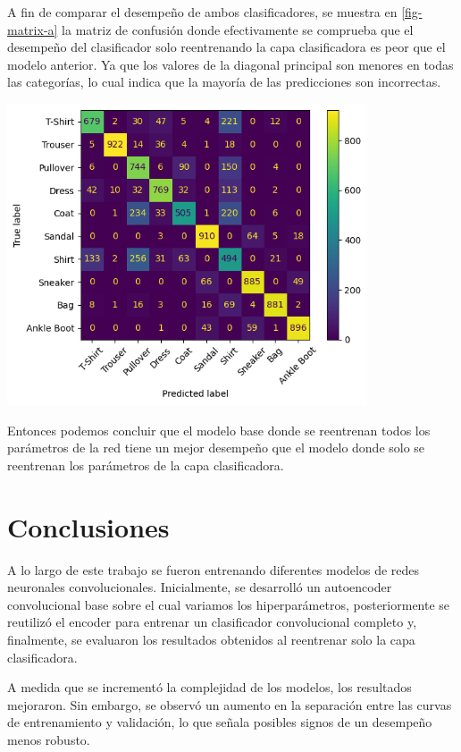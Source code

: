 \documentclass[aps,prl,reprint,groupedaddress]{revtex4-2}
\newenvironment{Figura}
  {\par\medskip\noindent\minipage{\linewidth}}
  {\endminipage\par\medskip}
\begin{document}
A fin de comparar el desempeño de ambos clasificadores, se muestra en 
\ref{fig-matrix-a} la matriz de confusión donde efectivamente se comprueba que 
el desempeño del clasificador solo reentrenando la capa clasificadora es peor
que el modelo anterior. Ya que los valores de la diagonal principal son menores
en todas las categorías, lo cual indica que la mayoría de las predicciones son
incorrectas.
\begin{Figura}
  \centering
  \includegraphics[width=0.80\textwidth]{figs1/matrix_confucion_modelo_original_entrenando_solo_clasificadora.png}
  \label{fig-matrix-a}
\end{Figura}

Entonces podemos concluir que el modelo base donde se reentrenan todos los
parámetros de la red tiene un mejor desempeño que el modelo donde solo se
reentrenan los parámetros de la capa clasificadora.

\section{Conclusiones}

A lo largo de este trabajo se fueron entrenando diferentes modelos de redes
neuronales convolucionales. Inicialmente, se desarrolló un autoencoder
convolucional base sobre el cual variamos los hiperparámetros, posteriormente se 
reutilizó el encoder para entrenar un clasificador convolucional completo y, 
finalmente, se evaluaron los resultados obtenidos al reentrenar solo la capa 
clasificadora.

A medida que se incrementó la complejidad de los modelos, los resultados 
mejoraron. Sin embargo, se observó un aumento en la separación entre las curvas 
de entrenamiento y validación, lo que señala posibles signos de un desempeño 
menos robusto.
\end{document}

